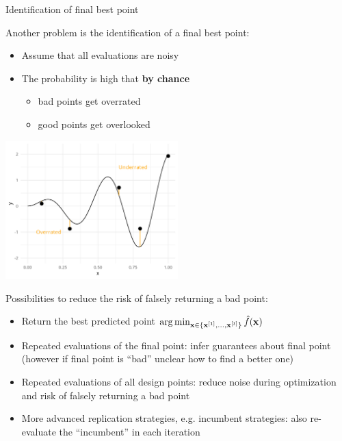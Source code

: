\documentclass[11pt,compress,t,notes=noshow, xcolor=table]{beamer}
\begin{document}
\begin{vbframe}{Identification of final best point}

Another problem is the identification of a final best point: 

\begin{itemize}
  \item Assume that all evaluations are noisy
  \item The probability is high that \textbf{by chance}
  \begin{itemize}
    \item bad points get overrated 
    \item good points get overlooked
  \end{itemize}
\end{itemize}


\begin{center}
  \includegraphics[width = 0.5\textwidth]{figure_man/noisy_5.png}
\end{center}

\framebreak 

Possibilities to reduce the risk of falsely returning a bad point: 
\begin{itemize}
  \item Return the best predicted point $\operatorname{arg\,min}_{\mathbf{x} \in \{\mathbf{x}^{[1]}, \ldots, \mathbf{x}^{[t]}\}} \hat{f}(\mathbf{x})$
  \item Repeated evaluations of the final point: infer guarantees about final point (however if final point is \enquote{bad} unclear how to find a better one)
  \item Repeated evaluations of all design points: reduce noise during optimization and risk of falsely returning a bad point
  \item More advanced replication strategies, e.g. incumbent strategies: also re-evaluate the \enquote{incumbent} in each iteration
\end{itemize}

\end{vbframe}


\endlecture
\end{document}
